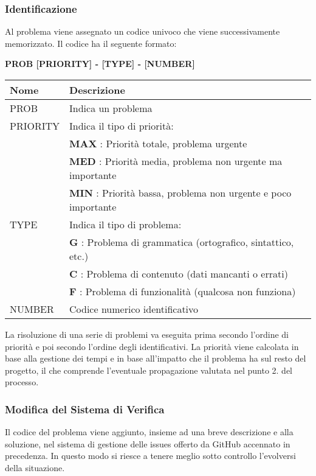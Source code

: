 \subsubsection{Identificazione}
Al problema viene assegnato un codice univoco che viene successivamente memorizzato. \newline 
Il codice ha il seguente formato: 
\begin{center}
    \textbf{PROB [PRIORITY] - [TYPE] - [NUMBER]}
\end{center}
\renewcommand{\arraystretch}{1.8} %
    \begin{tabular}{ |m{7em}|m{30em}| }
        \hline
        \textbf{Nome} & \textbf{Descrizione} \\
        \hline
            PROB & Indica un problema \\
        \hline
            PRIORITY 	& 	Indica il tipo di priorità: \\
                        &	\textbf{MAX} : Priorità totale, problema urgente \\
                        &	\textbf{MED} : Priorità media, problema non urgente ma importante \\
                        &	\textbf{MIN} : Priorità bassa, problema non urgente e poco importante \\
        \hline
                    
            TYPE 	& 	Indica il tipo di problema: \\
                    & 	\textbf{G} : Problema di grammatica (ortografico, sintattico, etc.) \\
                    &	\textbf{C} : Problema di contenuto (dati mancanti o errati) \\
                    &	\textbf{F} : Problema di funzionalità (qualcosa non funziona) \\
        \hline
            NUMBER & Codice numerico identificativo \\
        \hline
    \end{tabular} \newline \newline
La risoluzione di una serie di problemi va eseguita prima secondo l'ordine di priorità e poi secondo l'ordine degli identificativi. \newline 
La priorità viene calcolata in base alla gestione dei tempi e in base all'impatto che il problema ha sul resto del progetto, il che comprende l'eventuale propagazione valutata nel punto 2. del processo.
\subsubsection{Modifica del Sistema di Verifica}
Il codice del problema viene aggiunto, insieme ad una breve descrizione e alla soluzione, nel sistema di gestione delle issues offerto da GitHub accennato in precedenza.
In questo modo si riesce a tenere meglio sotto controllo l'evolversi della situazione.